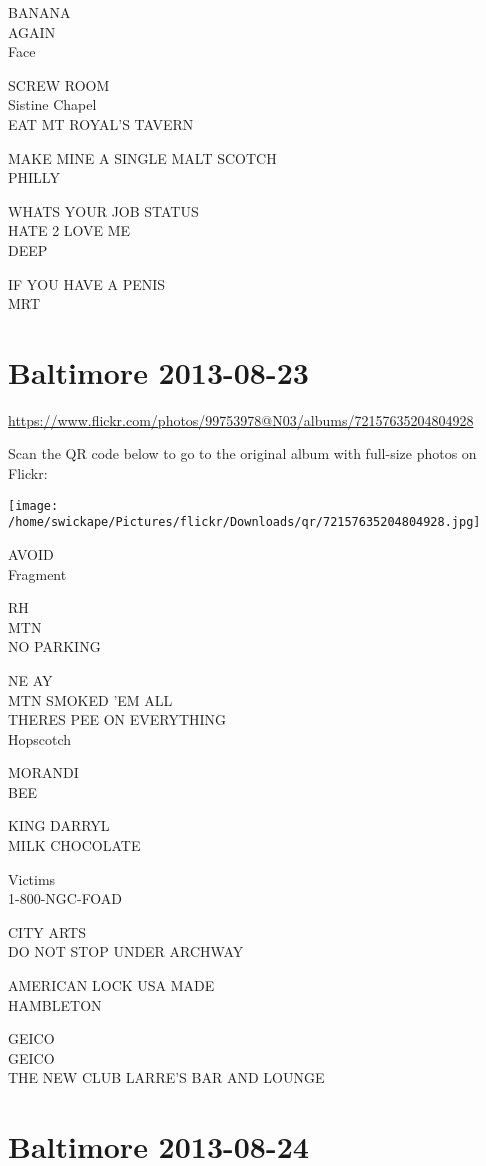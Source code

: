 \documentclass[10pt,letterpaper]{article}
\begin{document}
BANANA\\
AGAIN\\
Face

SCREW ROOM\\
Sistine Chapel\\
EAT MT ROYAL'S TAVERN

MAKE MINE A SINGLE MALT SCOTCH\\
PHILLY

WHATS YOUR JOB STATUS\\
HATE 2 LOVE ME\\
DEEP

IF YOU HAVE A PENIS\\
MRT
\pagebreak

\section*{Baltimore 2013-08-23}

\url{https://www.flickr.com/photos/99753978@N03/albums/72157635204804928}

Scan the QR code below to go to the original album with full-size photos on Flickr:

\texttt{[image: /home/swickape/Pictures/flickr/Downloads/qr/72157635204804928.jpg]}
\pagebreak

AVOID\\
Fragment

RH\\
MTN\\
NO PARKING

NE AY\\
MTN SMOKED 'EM ALL\\
THERES PEE ON EVERYTHING\\
Hopscotch

MORANDI\\
BEE

KING DARRYL\\
MILK CHOCOLATE

Victims\\
1{-}800{-}NGC{-}FOAD

CITY ARTS\\
DO NOT STOP UNDER ARCHWAY

AMERICAN LOCK USA MADE\\
HAMBLETON

GEICO\\
GEICO\\
THE NEW CLUB LARRE'S BAR AND LOUNGE
\pagebreak

\section*{Baltimore 2013-08-24}
\end{document}
